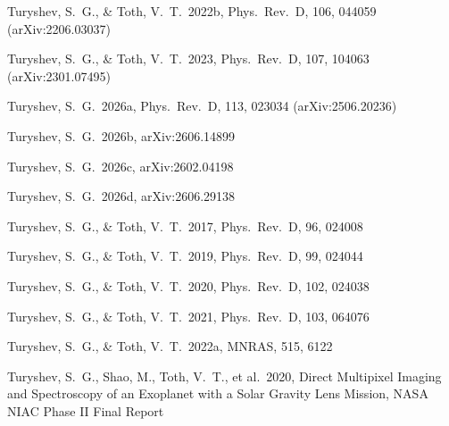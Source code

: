 \documentclass[twocolumn,10pt]{article}
\begin{document}
\begin{thebibliography}{}
Turyshev, S.~G., \& Toth, V.~T.\ 2022b, Phys.\ Rev.\ D, 106, 044059
(arXiv:2206.03037)

Turyshev, S.~G., \& Toth, V.~T.\ 2023, Phys.\ Rev.\ D, 107, 104063
(arXiv:2301.07495)

Turyshev, S.~G.\ 2026a, Phys.\ Rev.\ D, 113, 023034 (arXiv:2506.20236)

Turyshev, S.~G.\ 2026b, arXiv:2606.14899

Turyshev, S.~G.\ 2026c, arXiv:2602.04198

Turyshev, S.~G.\ 2026d, arXiv:2606.29138

Turyshev, S.~G., \& Toth, V.~T.\ 2017, Phys.\ Rev.\ D, 96, 024008

Turyshev, S.~G., \& Toth, V.~T.\ 2019, Phys.\ Rev.\ D, 99, 024044

Turyshev, S.~G., \& Toth, V.~T.\ 2020, Phys.\ Rev.\ D, 102, 024038

Turyshev, S.~G., \& Toth, V.~T.\ 2021, Phys.\ Rev.\ D, 103, 064076

Turyshev, S.~G., \& Toth, V.~T.\ 2022a, MNRAS, 515, 6122

Turyshev, S.~G., Shao, M., Toth, V.~T., et al.\ 2020, Direct Multipixel Imaging and Spectroscopy of an Exoplanet with a Solar Gravity Lens Mission, NASA NIAC Phase II Final Report

\end{thebibliography}
\end{document}
